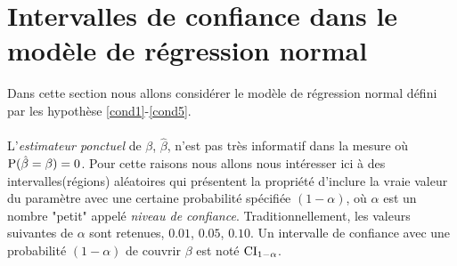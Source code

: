 \newpage

\section{Intervalles de confiance dans le modèle de régression normal}

Dans cette section nous allons considérer le modèle de régression normal défini par les hypothèse \ref{cond1}-\ref{cond5}.\\\\
L'\emph{estimateur ponctuel} de $\beta$, $\hat{\beta}$, n'est pas très informatif dans la mesure où $\operatorname{P}(\hat{\beta}=\beta)=0$. Pour cette raisons nous allons nous intéresser ici à des intervalles(régions) aléatoires qui présentent la propriété d'inclure la vraie valeur du paramètre avec une certaine probabilité spécifiée $(1-\alpha)$, où $\alpha$ est un nombre "petit" appelé \emph{niveau de confiance}. Traditionnellement, les valeurs suivantes de $\alpha$ sont retenues, $0.01$, $0.05$, $0.10$. Un intervalle de confiance avec une probabilité  $(1-\alpha)$ de couvrir $\beta$ est noté $\mathrm{CI}_{1-\alpha}$.

